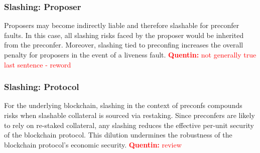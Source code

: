 \documentclass[a4paper]{article}
\theoremstyle{boldstyle}
\newcommand{\cm}[1]{\textcolor{blue}{\textbf{Conor:} #1}}
\newcommand{\qb}[1]{\textcolor{red}{\textbf{Quentin:} #1}}
\begin{document}
    \subsubsection{Slashing: Proposer}
        Proposers may become indirectly liable and therefore slashable for preconfer faults. In this case, all slashing risks faced by the proposer would be inherited from the preconfer. Moreover, slashing tied to preconfing increases the overall penalty for proposers in the event of a liveness fault. \qb{not generally true last sentence - reword}

    \subsubsection{Slashing: Protocol}
        For the underlying blockchain, slashing in the context of preconfs compounds risks when slashable collateral is sourced via restaking. Since preconfers are likely to rely on re-staked collateral, any slashing reduces the effective per-unit security of the blockchain protocol. This dilution undermines the robustness of the blockchain protocol's economic security. \qb{review}
\end{document}
